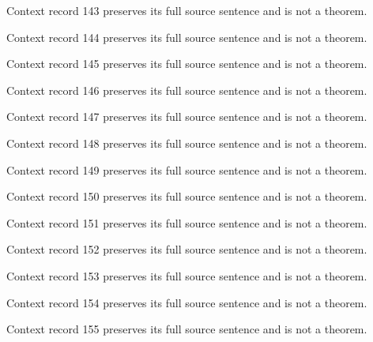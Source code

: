 \documentclass{article}
\begin{document}
\begin{remark}\label{train:context:143}Context record 143 preserves its full source sentence and is not a theorem.\end{remark}
\begin{remark}\label{train:context:144}Context record 144 preserves its full source sentence and is not a theorem.\end{remark}
\begin{remark}\label{train:context:145}Context record 145 preserves its full source sentence and is not a theorem.\end{remark}
\begin{remark}\label{train:context:146}Context record 146 preserves its full source sentence and is not a theorem.\end{remark}
\begin{remark}\label{train:context:147}Context record 147 preserves its full source sentence and is not a theorem.\end{remark}
\begin{remark}\label{train:context:148}Context record 148 preserves its full source sentence and is not a theorem.\end{remark}
\begin{remark}\label{train:context:149}Context record 149 preserves its full source sentence and is not a theorem.\end{remark}
\begin{remark}\label{train:context:150}Context record 150 preserves its full source sentence and is not a theorem.\end{remark}
\begin{remark}\label{train:context:151}Context record 151 preserves its full source sentence and is not a theorem.\end{remark}
\begin{remark}\label{train:context:152}Context record 152 preserves its full source sentence and is not a theorem.\end{remark}
\begin{remark}\label{train:context:153}Context record 153 preserves its full source sentence and is not a theorem.\end{remark}
\begin{remark}\label{train:context:154}Context record 154 preserves its full source sentence and is not a theorem.\end{remark}
\begin{remark}\label{train:context:155}Context record 155 preserves its full source sentence and is not a theorem.\end{remark}
\end{document}
